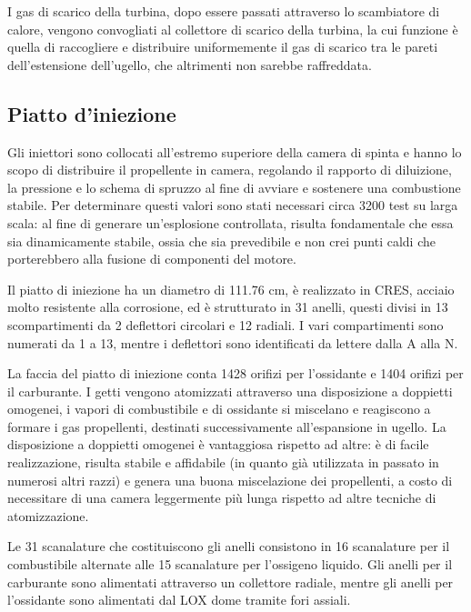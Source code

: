 I gas di scarico della turbina, dopo essere passati attraverso lo scambiatore di calore, vengono convogliati al collettore di scarico della turbina, la cui funzione è quella di raccogliere e distribuire uniformemente il gas di scarico tra le pareti dell’estensione dell'ugello, che altrimenti non sarebbe raffreddata.


\subsection{Piatto d'iniezione}
\label{subsec:piatto iniezione}


Gli iniettori sono collocati all’estremo superiore della camera di spinta e hanno lo scopo di distribuire il propellente in camera, regolando il rapporto di diluizione, la pressione e lo schema di spruzzo al fine di avviare e sostenere una combustione stabile. Per determinare questi valori sono stati necessari circa 3200 test su larga scala: al fine di generare un’esplosione controllata, risulta fondamentale che essa sia dinamicamente stabile, ossia che sia prevedibile e non crei punti caldi che porterebbero alla fusione di componenti del motore.

Il piatto di iniezione ha un diametro di 111.76 cm, è realizzato in CRES, acciaio molto resistente alla corrosione, ed è strutturato in 31 anelli, questi divisi in 13 scompartimenti da 2 deflettori circolari e 12 radiali. I vari compartimenti sono numerati da 1 a 13, mentre i deflettori sono identificati da lettere dalla A alla N.

La faccia del piatto di iniezione conta 1428 orifizi per l’ossidante e 1404 orifizi per il carburante. I getti vengono atomizzati attraverso una disposizione a doppietti omogenei, i vapori di combustibile e di ossidante si miscelano e reagiscono a formare i gas propellenti, destinati successivamente all’espansione in ugello. La disposizione a doppietti omogenei è vantaggiosa rispetto ad altre: è di facile realizzazione, risulta stabile e affidabile (in quanto già utilizzata in passato in numerosi altri razzi) e genera una buona miscelazione dei propellenti, a costo di necessitare di una camera leggermente più lunga rispetto ad altre tecniche di atomizzazione.

Le 31 scanalature che costituiscono gli anelli consistono in 16 scanalature per il combustibile alternate alle 15 scanalature per l’ossigeno liquido. Gli anelli per il carburante sono alimentati attraverso un collettore radiale, mentre gli anelli per l’ossidante sono alimentati dal LOX dome tramite fori assiali.

